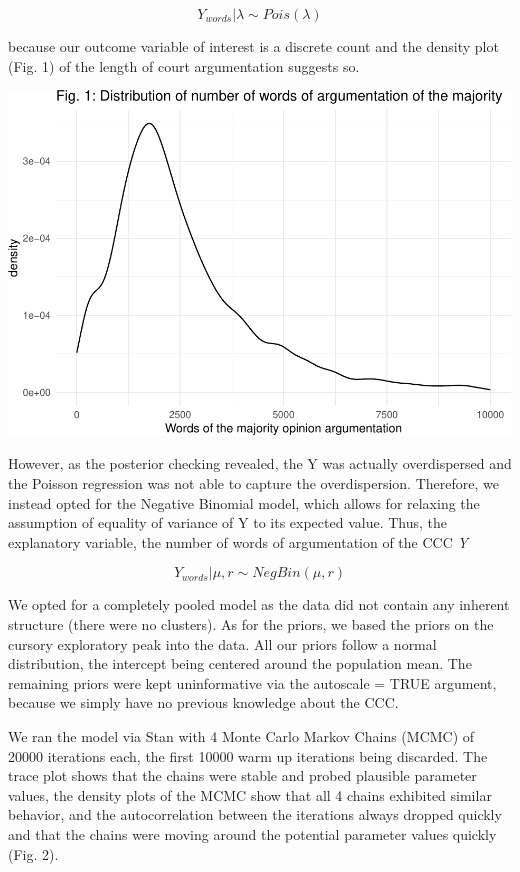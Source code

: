 \documentclass[
  11pt,
]{article}
\begin{document}
\[
Y_{words} | \lambda \sim Pois(\lambda)
\]

because our outcome variable of interest is a discrete count and the
density plot (Fig. 1) of the length of court argumentation suggests so.

\vspace{25pt}

\includegraphics{dissents_article_appendix_files/figure-latex/negbinom-1.pdf}
\vspace{25pt}

However, as the posterior checking revealed, the Y was actually
overdispersed and the Poisson regression was not able to capture the
overdispersion. Therefore, we instead opted for the Negative Binomial
model, which allows for relaxing the assumption of equality of variance
of Y to its expected value. Thus, the explanatory variable, the number
of words of argumentation of the CCC \emph{Y}

\[
Y_{words} | \mu, r \sim NegBin(\mu, r)
\]

We opted for a completely pooled model as the data did not contain any
inherent structure (there were no clusters). As for the priors, we based
the priors on the cursory exploratory peak into the data. All our priors
follow a normal distribution, the intercept being centered around the
population mean. The remaining priors were kept uninformative via the
autoscale = TRUE argument, because we simply have no previous knowledge
about the CCC.

We ran the model via Stan with 4 Monte Carlo Markov Chains (MCMC) of
20000 iterations each, the first 10000 warm up iterations being
discarded. The trace plot shows that the chains were stable and probed
plausible parameter values, the density plots of the MCMC show that all
4 chains exhibited similar behavior, and the autocorrelation between the
iterations always dropped quickly and that the chains were moving around
the potential parameter values quickly (Fig. 2).
\end{document}
